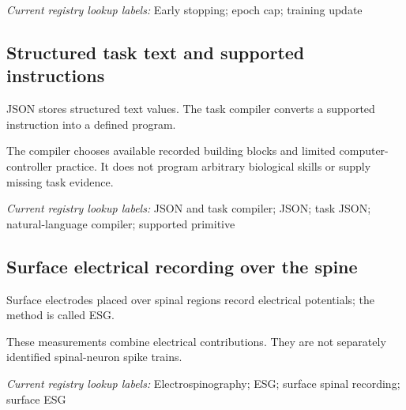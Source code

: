 \noindent\textit{Current registry lookup labels:} Early stopping; epoch cap; training update\par

\begin{samepage}
\subsection*{Structured task text and supported instructions}
\noindent JSON stores structured text values. The task compiler converts a supported instruction into a defined program.\par
\end{samepage}
\begin{samepage}
\noindent The compiler chooses available recorded building blocks and limited computer-controller practice. It does not program arbitrary biological skills or supply missing task evidence.\par\nopagebreak[4]

\end{samepage}


\noindent\textit{Current registry lookup labels:} JSON and task compiler; JSON; task JSON; natural-language compiler; supported primitive\par

\begin{samepage}
\subsection*{Surface electrical recording over the spine}
\noindent Surface electrodes placed over spinal regions record electrical potentials; the method is called ESG.\par
\end{samepage}
\begin{samepage}
\noindent These measurements combine electrical contributions. They are not separately identified spinal-neuron spike trains.\par\nopagebreak[4]

\end{samepage}


\noindent\textit{Current registry lookup labels:} Electrospinography; ESG; surface spinal recording; surface ESG\par


